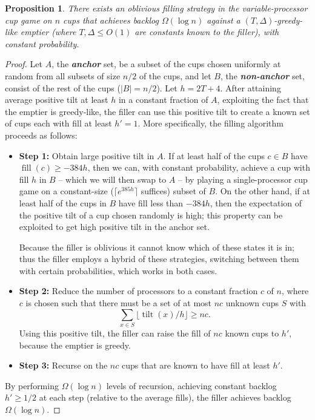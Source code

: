 \documentclass[twocolumn]{article}[10pt]
\newcommand{\defn}[1]{{\textit{\textbf{\boldmath #1}}}\xspace}
\DeclareMathOperator{\tilt}{\text{tilt}}
\DeclareMathOperator{\fil}{\text{fill}}
\newtheorem{proposition}{Proposition}
\begin{document}
\begin{proposition}
  \label{prop:obliviousBase}
  There exists an oblivious filling strategy in the variable-processor cup game
  on $n$ cups that achieves backlog $\Omega(\log n)$ against a $(T,
  \Delta)$-greedy-like emptier (where $T, \Delta \le O(1)$ are constants
  known to the filler), with constant probability.
\end{proposition}
\begin{proof}
  Let $A$, the \defn{anchor} set, be a subset of the cups chosen uniformly at
  random from all subsets of size $n/2$ of the cups, and let $B$, the
  \defn{non-anchor} set, consist of the rest of the cups ($|B| = n/2$). Let $h
  = 2 T + 4$. After attaining average positive tilt at least $h$ in a constant
  fraction of $A$, exploiting the fact that the emptier is greedy-like, the
  filler can use this positive tilt to create a known set of cups each with
  fill at least $h' = 1$. More specifically, the filling algorithm proceeds as
  follows: 
  \begin{itemize}
    \item \textbf{Step 1:} 
      Obtain large positive tilt in $A$. If at least half of the cups $c\in B$
      have $\fil(c) \ge -384h$, then we can, with constant probability, achieve
      a cup with fill $h$ in $B$ -- which we will then swap to $A$ -- by
      playing a single-processor cup game on a constant-size ($\lceil e^{385h}
      \rceil$ suffices) subset of $B$. 
      On the other hand, if at least half of the cups in $B$ have fill less than
      $-384h$, then the expectation of the positive tilt of a cup chosen
      randomly is high; this property can be exploited to get high positive
      tilt in the anchor set.

      Because the filler is oblivious it cannot know which of these states it is in; 
      thus the filler employs a hybrid of these strategies, switching between
      them with certain probabilities, which works in both cases.
  \item \textbf{Step 2:} Reduce the number of processors to a constant fraction
    $c$ of $n$, where $c$ is chosen such that there must be a set of at most $nc$ unknown cups $S$ with 
    $$\sum_{x\in S} \lfloor \tilt(x) / h \rfloor \ge nc.$$
    Using this positive tilt, the filler can raise the fill of $nc$ known cups
    to $h'$, because the emptier is greedy.
  \item \textbf{Step 3:} Recurse on the $nc$ cups that are known to have fill
    at least $h'$.
\end{itemize}
By performing $\Omega(\log n)$ levels of recursion, achieving constant backlog
$h'\ge 1/2$ at each step (relative to the average fills), the filler achieves backlog
$\Omega(\log n)$.


\end{proof}
\end{document}
